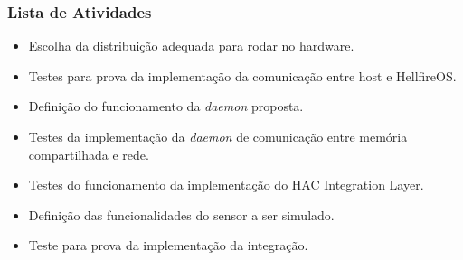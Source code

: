 \subsubsection{Lista de Atividades}
\begin{itemize}
\item Escolha da distribuição adequada para rodar no hardware.
\item Testes para prova da implementação da comunicação entre host e HellfireOS.
\item Definição do funcionamento da \textit{daemon} proposta.
\item Testes da implementação da \textit{daemon} de comunicação entre memória compartilhada e rede.
\item Testes do funcionamento da implementação do HAC Integration Layer.
\item Definição das funcionalidades do sensor a ser simulado.
\item Teste para prova da implementação da integração.
\end{itemize}

